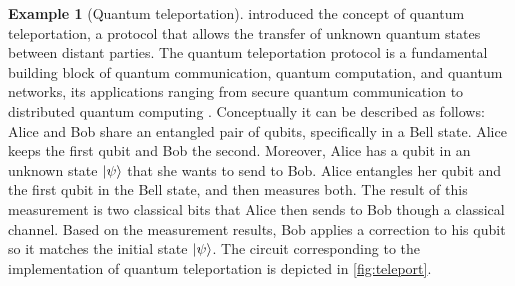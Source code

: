 \documentclass[10pt,a4paper]{amsart}
\theoremstyle{definition}
\theoremstyle{definition}
\newtheorem{example}[definition]{Example}
\theoremstyle{definition}
\theoremstyle{definition}
\theoremstyle{definition}
\theoremstyle{definition}
\begin{document}
\begin{example}[Quantum teleportation]
\cite{bennett1993teleporting} introduced the concept of quantum teleportation,
a protocol that allows the transfer of  unknown quantum states between distant
parties.  The quantum teleportation protocol is a fundamental building block of
quantum communication, quantum computation, and quantum networks, its
applications ranging from secure quantum communication to distributed quantum
computing
\cite{briegel1998quantum,gottesman1999demonstrating,kimble2008quantum}.
Conceptually it can be described as follows: Alice and Bob share an entangled
pair of qubits, specifically in a Bell state. Alice keeps the first qubit and
Bob the second. Moreover, Alice has a qubit in an unknown state $\ket{\psi}$
that she wants to send to Bob.  Alice entangles her qubit and the first qubit
in the Bell state, and then measures both. The result of this measurement is
two classical bits that Alice then sends to Bob though a classical channel.
Based on the measurement results, Bob applies a correction to his qubit so it
matches the initial state $\ket{\psi}$.  The circuit corresponding to the
implementation of quantum teleportation is depicted in \autoref{fig:teleport}.



\end{example}
\end{document}
